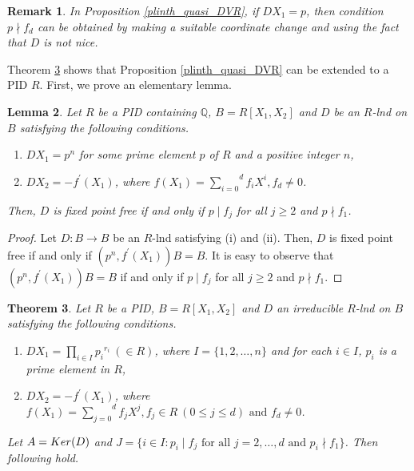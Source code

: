 \documentclass[a4paper,12pt]{article}
\newtheorem{thm}{Theorem}[section]
\newtheorem{lem}[thm]{Lemma}
\newtheorem{rem}[thm]{Remark}
\newcommand{\bQ}{\mathbb Q}
\begin{document}
{\begin{rem}\label{degree one}
{\em In Proposition \ref{plinth_quasi_DVR}, if $DX_1=p$, then condition $p\nmid f_d$ can be obtained by making a suitable coordinate change and using the fact that $D$ is not nice.
}
\end{rem}



Theorem \ref{plinth_quasi_PID} shows that Proposition \ref{plinth_quasi_DVR} can be extended to a PID $R$. First, we prove an elementary lemma.

\begin{lem}\label{local ff}
Let $R$ be a {\rm PID} containing $\bQ$, $B=R[X_1,X_2]$ and $D$ be an $R$-lnd on $B$ satisfying the following conditions.

\begin{enumerate}
	\item [\rm(i)] $DX_1=p^n$ for some prime element $p$ of $R$ and a positive integer $n$,
	\item [\rm(ii)] $DX_2=-f^{\prime}(X_1)$, where $f(X_1)=\overset{d}{\underset{i=0}{\sum}} f_iX^i, f_d\neq 0$.
\end{enumerate} 
Then, $D$ is fixed point free if and only if $p\mid f_j$ for all $j\geqslant 2$ and $p\nmid f_1$.
\end{lem}

\begin{proof}
Let $D:B\longrightarrow B$ be an $R$-lnd satisfying (i) and (ii). Then, $D$ is fixed point free if and only if $(p^n, f^{\prime}(X_1))B=B$. It is easy to observe that $(p^n, f^{\prime}(X_1))B=B$ if and only if $p\mid f_j$ for all $j\geqslant 2$ and $p\nmid f_1$.
\end{proof}

\begin{thm}\label{plinth_quasi_PID}
Let $R$ be a {\rm PID}, $B=R[X_1,X_2]$ and $D$ an irreducible $R$-lnd on $B$ satisfying the following conditions.

\begin{enumerate}
	\item [\rm(i)] $DX_1=\underset{i\in I}\prod{p_i}^{r_i}~(\in R)$, where $I=\{1,2,\dots,n\}$ and for each $i\in I$, $p_i$ is a prime element in $R$,
	\item[\rm(ii)] $DX_2=-f^{\prime}(X_1)$, where $f(X_1)=\overset{d}{\underset{j=0}{\sum}} f_jX^j, f_j\in R~(0\leqslant j\leqslant d) \text{ and }f_d\neq 0$.
\end{enumerate}
Let $A={\rm Ker}(D)$ and  $J=\{i\in I:p_i\mid f_j \text{ for all }j=2,\dots,d \text{ and }p_i\nmid f_1\}$. Then following hold.


\end{thm}}
\end{document}
